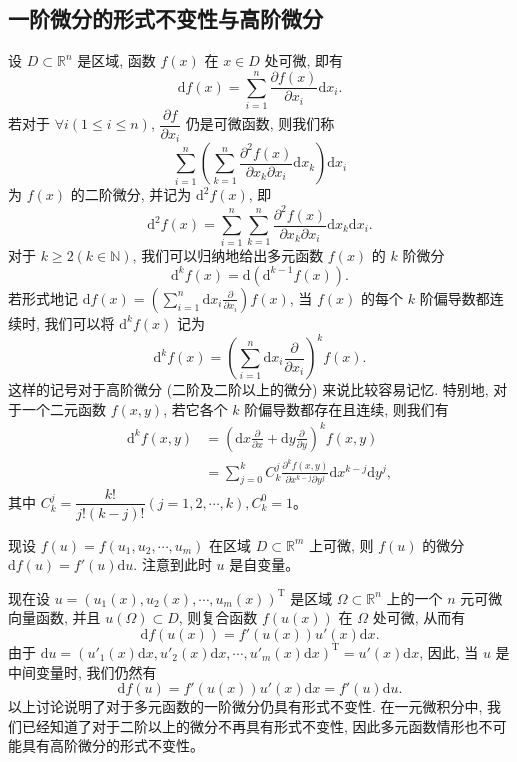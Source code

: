 \documentclass[UTF8,12pt,a4paper,fontset=fandol]{ctexart}
\begin{document}
\subsection{一阶微分的形式不变性与高阶微分}

设 $D\subset\mathbb R^n$ 是区域, 函数 $f(x)$ 在 $x\in D$ 处可微, 即有
\[
  \mathrm df(x)=\sum_{i=1}^n\frac{\partial f(x)}{\partial x_i}\mathrm dx_i.
\]
若对于 $\forall i(1\leqslant i\leqslant n)$, $\dfrac{\partial f}{\partial x_i}$ 仍是可微函数, 则我们称
\[
  \sum_{i=1}^n\left(\sum_{k=1}^n
  \frac{\partial^2 f(x)}{\partial x_k\partial x_i}\mathrm dx_k\right)\mathrm dx_i
\]
为 $f(x)$ 的二阶微分, 并记为 $\mathrm d^2f(x)$, 即
\[
  \mathrm d^2f(x)=\sum_{i=1}^n\sum_{k=1}^n
  \frac{\partial^2 f(x)}{\partial x_k\partial x_i}\mathrm dx_k\mathrm dx_i.
\]
对于 $k\geqslant2(k\in\mathbb N)$, 我们可以归纳地给出多元函数 $f(x)$ 的 $k$ 阶微分
\[
  \mathrm d^kf(x)=\mathrm d(\mathrm d^{k-1}f(x)).
\]
若形式地记 $\mathrm df(x)=\left(\sum_{i=1}^n\mathrm dx_i\frac{\partial}{\partial x_i}\right)f(x)$, 当 $f(x)$ 的每个 $k$ 阶偏导数都连续时, 我们可以将 $\mathrm d^kf(x)$ 记为
\[
  \mathrm d^kf(x)=\left(\sum_{i=1}^n\mathrm dx_i\frac{\partial}{\partial x_i}\right)^kf(x).
\]
这样的记号对于高阶微分 (二阶及二阶以上的微分) 来说比较容易记忆. 特别地, 对于一个二元函数 $f(x,y)$, 若它各个 $k$ 阶偏导数都存在且连续, 则我们有
\[
\begin{aligned}
  \mathrm d^kf(x,y)
  &=\left(\mathrm dx\frac{\partial}{\partial x}
  +\mathrm dy\frac{\partial}{\partial y}\right)^kf(x,y)\\
  &=\sum_{j=0}^k C_k^j
  \frac{\partial^k f(x,y)}{\partial x^{k-j}\partial y^j}
  \mathrm dx^{k-j}\mathrm dy^j,
\end{aligned}
\]
其中 $C_k^j=\dfrac{k!}{j!(k-j)!}(j=1,2,\cdots,k),C_k^0=1$。

现设 $f(u)=f(u_1,u_2,\cdots,u_m)$ 在区域 $D\subset\mathbb R^m$ 上可微, 则 $f(u)$ 的微分 $\mathrm df(u)=f'(u)\mathrm du$. 注意到此时 $u$ 是自变量。

现在设 $u=(u_1(x),u_2(x),\cdots,u_m(x))^\mathrm T$ 是区域 $\Omega\subset\mathbb R^n$ 上的一个 $n$ 元可微向量函数, 并且 $u(\Omega)\subset D$, 则复合函数 $f(u(x))$ 在 $\Omega$ 处可微, 从而有
\[
  \mathrm df(u(x))=f'(u(x))u'(x)\mathrm dx.
\]
由于 $\mathrm du=(u'_1(x)\mathrm dx,u'_2(x)\mathrm dx,\cdots,u'_m(x)\mathrm dx)^\mathrm T=u'(x)\mathrm dx$, 因此, 当 $u$ 是中间变量时, 我们仍然有
\[
  \mathrm df(u)=f'(u(x))u'(x)\mathrm dx=f'(u)\mathrm du.
\]
以上讨论说明了对于多元函数的一阶微分仍具有形式不变性. 在一元微积分中, 我们已经知道了对于二阶以上的微分不再具有形式不变性, 因此多元函数情形也不可能具有高阶微分的形式不变性。
\end{document}
